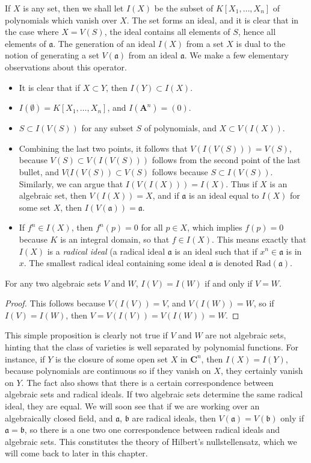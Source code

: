 If $X$ is any set, then we shall let $I(X)$ be the subset of $K[X_1, \dots, X_n]$ of polynomials which vanish over $X$. The set forms an ideal, and it is clear that in the case where $X = V(S)$, the ideal contains all elements of $S$, hence all elements of $\mathfrak{a}$. The generation of an ideal $I(X)$ from a set $X$ is dual to the notion of generating a set $V(\mathfrak{a})$ from an ideal $\mathfrak{a}$. We make a few elementary observations about this operator.
%
\begin{itemize}
    \item It is clear that if $X \subset Y$, then $I(Y) \subset I(X)$.
    \item $I(\emptyset) = K[X_1, \dots, X_n]$, and $I(\mathbf{A}^n) = (0)$.
    \item $S \subset I(V(S))$ for any subset $S$ of polynomials, and $X \subset V(I(X))$.
    \item Combining the last two points, it follows that $V(I(V(S))) = V(S)$, because $V(S) \subset V(I(V(S)))$ follows from the second point of the last bullet, and $V(I(V(S)) \subset V(S)$ follows because $S \subset I(V(S))$. Similarly, we can argue that $I(V(I(X))) = I(X)$. Thus if $X$ is an algebraic set, then $V(I(X)) = X$, and if $\mathfrak{a}$ is an ideal equal to $I(X)$ for some set $X$, then $I(V(\mathfrak{a})) = \mathfrak{a}$.
    \item If $f^n \in I(X)$, then $f^n(p) = 0$ for all $p \in X$, which implies $f(p) = 0$ because $K$ is an integral domain, so that $f \in I(X)$. This means exactly that $I(X)$ is a {\it radical ideal} (a radical ideal $\mathfrak{a}$ is an ideal such that if $x^n \in \mathfrak{a}$ is in $x$. The smallest radical ideal containing some ideal $\mathfrak{a}$ is denoted $\text{Rad}(\mathfrak{a})$.
\end{itemize}

\begin{prop}
    For any two algebraic sets $V$ and $W$, $I(V) = I(W)$ if and only if $V = W$.
\end{prop}
\begin{proof}
    This follows because $V(I(V)) = V$, and $V(I(W)) = W$, so if $I(V) = I(W)$, then $V = V(I(V)) = V(I(W)) = W$.
\end{proof}

This simple proposition is clearly not true if $V$ and $W$ are not algebraic sets, hinting that the class of varieties is well separated by polynomial functions. For instance, if $Y$ is the closure of some open set $X$ in $\mathbf{C}^n$, then $I(X) = I(Y)$, because polynomials are continuous so if they vanish on $X$, they certainly vanish on $Y$. The fact also shows that there is a certain correspondence between algebraic sets and radical ideals. If two algebraic sets determine the same radical ideal, they are equal. We will soon see that if we are working over an algebraically closed field, and $\mathfrak{a}$, $\mathfrak{b}$ are radical ideals, then $V(\mathfrak{a}) = V(\mathfrak{b})$ only if $\mathfrak{a} = \mathfrak{b}$, so there is a one two one correspondence between radical ideals and algebraic sets. This constitutes the theory of Hilbert's nullstellensatz, which we will come back to later in this chapter.

